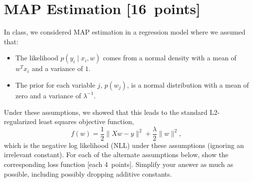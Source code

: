 \documentclass{article}
\newcommand{\blu}[1]{{\textcolor{blu}{#1}}}
\let\ask\blu
\newcommand\pts[1]{\textcolor{pointscolour}{[#1~points]}}
\newcommand{\norm}[1]{\lVert #1 \rVert}
\begin{document}
\clearpage
\section{MAP Estimation \pts{16}}

In class, we considered MAP estimation in a regression model where we assumed that:
\begin{itemize}
\item The likelihood $p(y_i \mid x_i, w)$ comes from a normal density with a mean of $w^Tx_i$ and a variance of $1$.
\item The prior for each variable $j$, $p(w_j)$, is a normal distribution with a mean of zero and a variance of $\lambda^{-1}$.
\end{itemize}
Under these assumptions, we showed that this leads to the standard L2-regularized least squares objective function,
\[
f(w) = \frac{1}{2}\norm{Xw - y}^2 + \frac \lambda 2 \norm{w}^2,
\]
which is the negative log likelihood (NLL) under these assumptions (ignoring an irrelevant constant).
\ask{For each of the alternate assumptions below, show the corresponding loss function} \pts{each 4}. Simplify your answer as much as possible, including possibly dropping additive constants.
\end{document}
